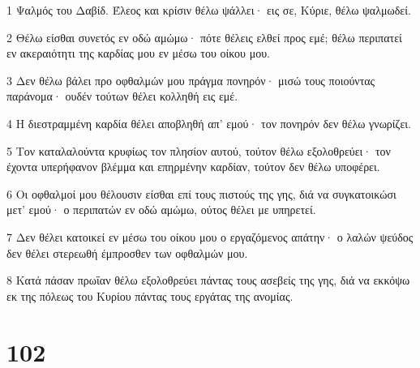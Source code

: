 \par 1 Ψαλμός του Δαβίδ. Έλεος και κρίσιν θέλω ψάλλει· εις σε, Κύριε, θέλω ψαλμωδεί.
\par 2 Θέλω είσθαι συνετός εν οδώ αμώμω· πότε θέλεις ελθεί προς εμέ; θέλω περιπατεί εν ακεραιότητι της καρδίας μου εν μέσω του οίκου μου.
\par 3 Δεν θέλω βάλει προ οφθαλμών μου πράγμα πονηρόν· μισώ τους ποιούντας παράνομα· ουδέν τούτων θέλει κολληθή εις εμέ.
\par 4 Η διεστραμμένη καρδία θέλει αποβληθή απ' εμού· τον πονηρόν δεν θέλω γνωρίζει.
\par 5 Τον καταλαλούντα κρυφίως τον πλησίον αυτού, τούτον θέλω εξολοθρεύει· τον έχοντα υπερήφανον βλέμμα και επηρμένην καρδίαν, τούτον δεν θέλω υποφέρει.
\par 6 Οι οφθαλμοί μου θέλουσιν είσθαι επί τους πιστούς της γης, διά να συγκατοικώσι μετ' εμού· ο περιπατών εν οδώ αμώμω, ούτος θέλει με υπηρετεί.
\par 7 Δεν θέλει κατοικεί εν μέσω του οίκου μου ο εργαζόμενος απάτην· ο λαλών ψεύδος δεν θέλει στερεωθή έμπροσθεν των οφθαλμών μου.
\par 8 Κατά πάσαν πρωΐαν θέλω εξολοθρεύει πάντας τους ασεβείς της γης, διά να εκκόψω εκ της πόλεως του Κυρίου πάντας τους εργάτας της ανομίας.

\chapter{102}

